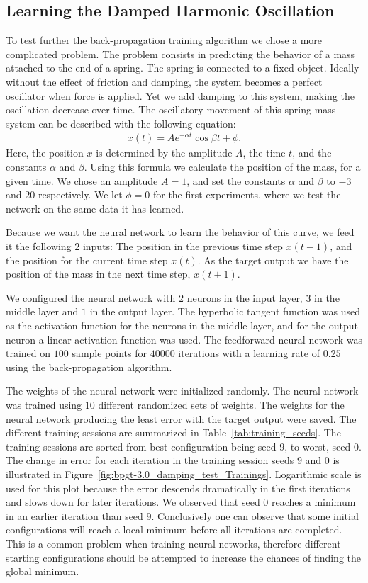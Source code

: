 \documentclass[11pt]{article}
\begin{document}
\subsection{Learning the Damped Harmonic Oscillation} %
\label{sub:a_more_complex_problem}
To test further the back-propagation training algorithm we chose a more complicated problem. The problem consists in predicting the
behavior of a mass attached to the end of a spring. The spring is connected to a fixed object. Ideally without the effect of friction
and damping, the system becomes a perfect oscillator when force is applied. Yet we add damping to this system, making the oscillation decrease over time. The oscillatory movement of this spring-mass system can be described with the following equation:
\begin{eqnarray}\label{eqn:damping}
	x(t) = Ae^{-\alpha t}\cos{\beta t+\phi}.
\end{eqnarray}
Here, the position $x$ is determined by the amplitude $A$, the time $t$, and the constants $\alpha$ and $\beta$. Using this formula we
calculate the position of the mass, for a given time. We chose an amplitude $A=1$, and set the constants $\alpha$ and $\beta$ to $-3$
and $20$ respectively. We let $\phi=0$ for the first experiments, where we test the network on the same data it has learned.

Because we want the neural network to learn the behavior of this curve, we feed it the following $2$ inputs: The position in the
previous time step $x(t-1)$, and the position for the current time step $x(t)$. As the target output we have the position of the mass in
the next time step, $x(t+1)$.

We configured the neural network with $2$ neurons in the input layer, $3$ in the middle layer and $1$ in the output layer. The
hyperbolic tangent function was used as the activation function for the neurons in the middle layer, and for the output neuron a linear
activation function was used. The feedforward neural network was trained on $100$ sample points for $40000$ iterations with a learning
rate of $0.25$ using the back-propagation algorithm.

The weights of the neural network were initialized randomly. The neural network was trained using $10$ different randomized sets of
weights. The weights for the neural network producing the least error with the target output were saved. The different training sessions
are summarized in Table~\ref{tab:training_seeds}. The training sessions are sorted from best configuration being seed $9$, to worst,
seed $0$. The change in error for each iteration in the training session seeds $9$ and $0$ is illustrated in
Figure~\ref{fig:bpgt-3.0_damping_test_Trainings}. Logarithmic scale is used for this plot because the error descends dramatically in the
first iterations and slows down for later iterations. We observed that seed $0$ reaches a minimum in an earlier iteration than seed $9$.
Conclusively one can observe that some initial configurations will reach a local minimum before all iterations are completed. This is a
common problem when training neural networks, therefore different starting configurations should be attempted to increase the chances of
finding the global minimum.
\end{document}
